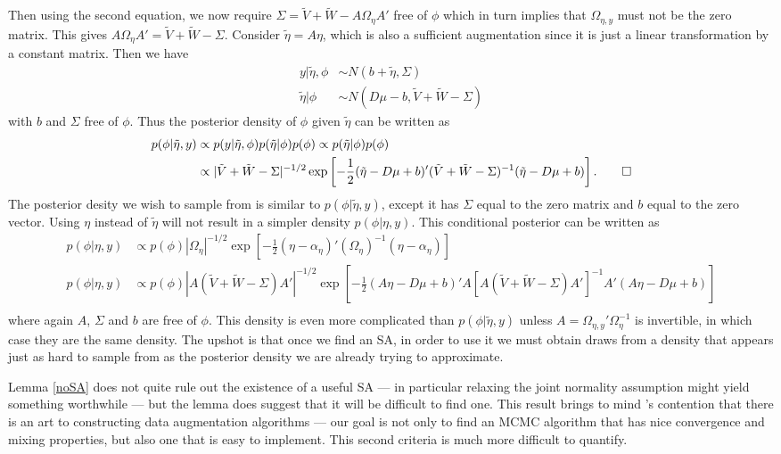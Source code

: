 \documentclass{article}
\begin{document}
Then using the second equation, we now require $\Sigma = \tilde{V} + \tilde{W} - A\Omega_{\eta}A'$ free of $\phi$ which in turn implies that $\Omega_{\eta,y}$ must not be the zero matrix. This gives $A\Omega_{\eta}A' = \tilde{V} + \tilde{W} - \Sigma$. Consider $\tilde{\eta}=A\eta$, which is also a sufficient augmentation since it is just a linear transformation by a constant matrix. Then we have
\begin{align*}
y|\tilde{\eta},\phi & \sim N(b + \tilde{\eta}, \Sigma)\\
\tilde{\eta}|\phi & \sim N(D\mu - b, \tilde{V} + \tilde{W} - \Sigma)
\end{align*}
with $b$ and $\Sigma$ free of $\phi$. Thus the posterior density of $\phi$ given $\tilde{\eta}$ can be written as
\begin{align*}
  p(\phi|\tilde{\eta}, y) &\propto p(y|\tilde{\eta},\phi)p(\tilde{\eta}|\phi)p(\phi) \propto p(\tilde{\eta}|\phi)p(\phi) \\
&\propto |\tilde{V} + \tilde{W} - \Sigma|^{-1/2}\exp\left[-\frac{1}{2}(\tilde{\eta} - D\mu + b)'(\tilde{V} + \tilde{W} - \Sigma)^{-1}(\tilde{\eta} - D\mu + b)\right]. \qed
\end{align*}
The posterior desity we wish to sample from is similar to $p(\phi|\tilde{\eta},y)$, except it has $\Sigma$ equal to the zero matrix and $b$ equal to the zero vector. Using $\eta$ instead of $\tilde{\eta}$ will not result in a simpler density $p(\phi|\eta,y)$. This conditional posterior can be written as
\begin{align*}
p(\phi|\eta,y) &\propto p(\phi) |\Omega_{\eta}|^{-1/2}\exp\left[-\frac{1}{2}(\eta - \alpha_{\eta})'(\Omega_{\eta})^{-1}(\eta - \alpha_{\eta})\right]\\
p(\phi|\eta,y) &\propto p(\phi) |A(\tilde{V} + \tilde{W} - \Sigma)A'|^{-1/2}\exp\left[-\frac{1}{2}(A\eta - D\mu + b)'A[A(\tilde{V} + \tilde{W} - \Sigma)A']^{-1}A'(A\eta - D\mu + b)\right]\\
\end{align*}
where again $A$, $\Sigma$ and $b$ are free of $\phi$. This density is even more complicated than $p(\phi|\tilde{\eta},y)$ unless $A=\Omega_{\eta,y}'\Omega_\eta^{-1}$ is invertible, in which case they are the same density. The upshot is that once we find an SA, in order to use it we must obtain draws from a density that appears just as hard to sample from as the posterior density we are already trying to approximate.

Lemma \ref{noSA} does not quite rule out the existence of a useful SA --- in particular relaxing the joint normality assumption might yield something worthwhile --- but the lemma does suggest that it will be difficult to find one. This result brings to mind 's contention that there is an art to constructing data augmentation algorithms --- our goal is not only to find an MCMC algorithm that has nice convergence and mixing properties, but also one that is easy to implement. This second criteria is much more difficult to quantify. 
\end{document}
